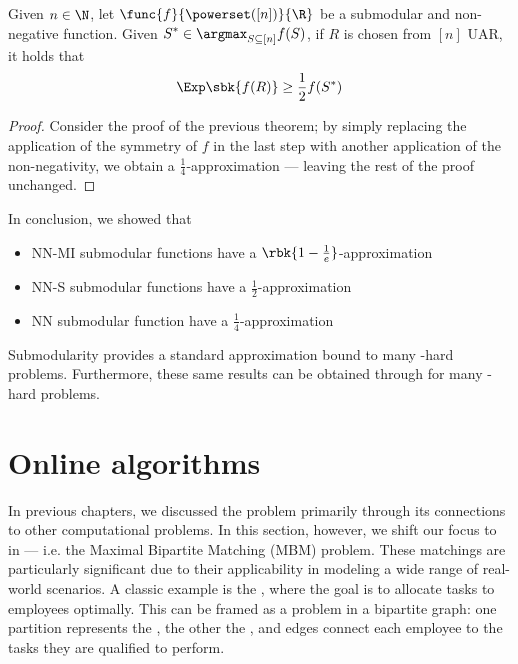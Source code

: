 \documentclass[a4paper, 12pt]{report}
\begin{document}
    \begin{framedthm}{}
        Given $n \in \N$, let $\func{f}{\powerset([n])}{\R}$ be a submodular and non-negative function. Given $\displaystyle S^* \in \argmax_{S \subseteq [n]}{f(S)}$, if $R$ is chosen from $[n]$ UAR, it holds that $$\Exp \sbk{f(R)} \ge \dfrac{1}{2}f(S^*)$$
    \end{framedthm}

    \begin{proof}
         Consider the proof of the previous theorem; by simply replacing the application of the symmetry of $f$ in the last step with another application of the non-negativity, we obtain a $\tfrac{1}{4}$-approximation --- leaving the rest of the proof unchanged.
    \end{proof}

    In conclusion, we showed that
    
    \begin{itemize}
        \item NN-MI submodular functions have a $\rbk{1 - \tfrac{1}{e}}$-approximation
        \item NN-S submodular functions have a $\tfrac{1}{2}$-approximation
        \item NN submodular function have a $\tfrac{1}{4}$-approximation
    \end{itemize}

    Submodularity provides a standard approximation bound to many \NPclass-hard  problems. Furthermore, these same results can be obtained through  for many \NPclass-hard  problems.

    \chapter{Online algorithms}

    In previous chapters, we discussed the  problem primarily through its connections to other computational problems. In this section, however, we shift our focus to  in  --- i.e. the Maximal Bipartite Matching (MBM) problem. These matchings are particularly significant due to their applicability in modeling a wide range of real-world scenarios. A classic example is the , where the goal is to allocate tasks to employees optimally. This can be framed as a  problem in a bipartite graph: one partition represents the , the other the , and edges connect each employee to the tasks they are qualified to perform.
\end{document}
